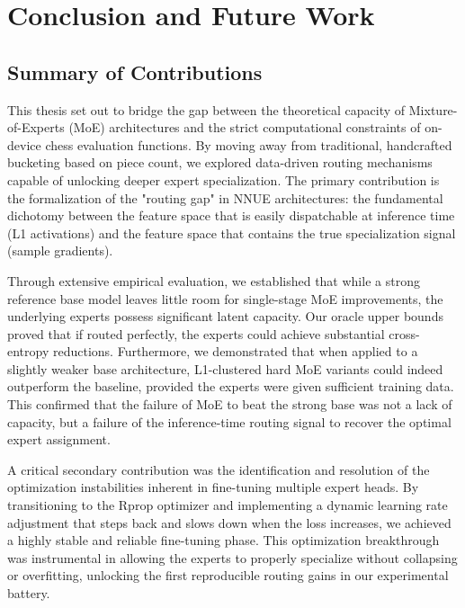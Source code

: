 \chapter{Conclusion and Future Work}

\section{Summary of Contributions}

This thesis set out to bridge the gap between the theoretical capacity of Mixture-of-Experts (MoE) architectures and the strict computational constraints of on-device chess evaluation functions. By moving away from traditional, handcrafted bucketing based on piece count, we explored data-driven routing mechanisms capable of unlocking deeper expert specialization. The primary contribution is the formalization of the "routing gap" in NNUE architectures: the fundamental dichotomy between the feature space that is easily dispatchable at inference time (L1 activations) and the feature space that contains the true specialization signal (sample gradients).

Through extensive empirical evaluation, we established that while a strong reference base model leaves little room for single-stage MoE improvements, the underlying experts possess significant latent capacity. Our oracle upper bounds proved that if routed perfectly, the experts could achieve substantial cross-entropy reductions. Furthermore, we demonstrated that when applied to a slightly weaker base architecture, L1-clustered hard MoE variants could indeed outperform the baseline, provided the experts were given sufficient training data. This confirmed that the failure of MoE to beat the strong base was not a lack of capacity, but a failure of the inference-time routing signal to recover the optimal expert assignment.

A critical secondary contribution was the identification and resolution of the optimization instabilities inherent in fine-tuning multiple expert heads. By transitioning to the Rprop optimizer and implementing a dynamic learning rate adjustment that steps back and slows down when the loss increases, we achieved a highly stable and reliable fine-tuning phase. This optimization breakthrough was instrumental in allowing the experts to properly specialize without collapsing or overfitting, unlocking the first reproducible routing gains in our experimental battery.

